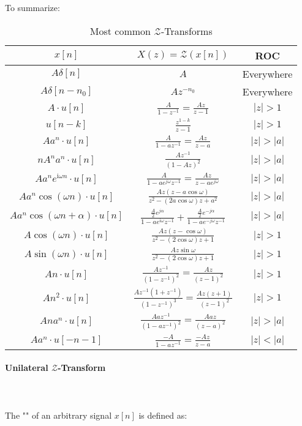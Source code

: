 	To summarize:
	\begin{table}[H]
		\centering
		\begin{tabular}{|c|c|c|}
		\rowcolor[HTML]{C0C0C0} \hline$x[n]$ & $X(z)=\mathcal{Z}(x[n])$ & \textbf{ROC} \\
		\hline \hline$A \delta[n]$ & $A$ & Everywhere \\
		\hline$A \delta\left[n-n_0\right]$ & $A z^{-n_0}$ & Everywhere \\
		\hline$A \cdot u[n]$ & $\frac{A}{1-z^{-1}}=\frac{A z}{z-1}$ & $|z|>1$ \\
		\hline$u[n-k]$ & $\frac{z^{1-k}}{z-1}$ & $|z|>1$ \\
		\hline$A a^n \cdot u[n]$ & $\frac{A}{1-a z^{-1}}=\frac{A z}{z-a}$ & $|z|>|a|$ \\
		\hline$ nA^n a^n \cdot u[n]$ & $\frac{Az^{-1}}{(1-Az)^2}$ & $|z|>|a|$ \\
		\hline$A a^n e^{\mathrm{i} \omega n} \cdot u[n]$ & $\frac{A}{1-a e^{j \omega} z^{-1}}=\frac{A z}{z-a e^{j \omega}}$ & $|z|>|a|$ \\
		\hline$A a^n \cos (\omega n) \cdot u[n]$ & $\frac{A z(z-a \cos \omega)}{z^2-(2 a \cos \omega) z+a^2}$ & $|z|>|a|$ \\
		\hline$A a^n \cos (\omega n+\alpha) \cdot u[n]$ & $\frac{\frac{A}{2} e^{j \alpha}}{1-a e^{\mathrm{i} \omega} z^{-1}}+\frac{\frac{A}{2} e^{-j \alpha}}{1-a e^{-j \omega} z^{-1}}$ & $|z|>|a|$ \\
		\hline$A \cos (\omega n) \cdot u[n]$ & $\frac{A z(z-\cos \omega)}{z^2-(2 \cos \omega) z+1}$ & $|z|>1$ \\
		\hline$A \sin (\omega n) \cdot u[n]$ & $\frac{A z \sin \omega}{z^2-(2 \cos \omega) z+1}$ & $|z|>1$ \\
		\hline$A n \cdot u[n]$ & $\frac{A z^{-1}}{\left(1-z^{-1}\right)^2}=\frac{A z}{(z-1)^2}$ & $|z|>1$ \\
		\hline$A n^2 \cdot u[n]$ & $\frac{A z^{-1}\left(1+z^{-1}\right)}{\left(1-z^{-1}\right)^3}=\frac{A z(z+1)}{(z-1)^2}$ & $|z|>1$ \\
		\hline$A n a^n \cdot u[n]$ & $\frac{A a z^{-1}}{\left(1-a z^{-1}\right)^2}=\frac{A a z}{(z-a)^2}$ & $|z|>|a|$ \\
		\hline$A a^n \cdot u[-n-1]$ & $\frac{-A}{1-a z^{-1}}=\frac{-A z}{z-a}$ & $|z|<|a|$ \\
		\hline
		\end{tabular}
		\caption{Most common $\mathcal{Z}$-Transforms}
	\end{table}	
	
	
	\paragraph{Unilateral $\mathcal{Z}$-Transform}\label{unilateral z transform}\mbox{}\\\\
	The "" of an arbitrary signal $x[n]$ is defined as:
	
